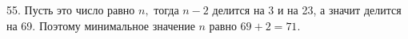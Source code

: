 55. Пусть это число равно $n,$ тогда $n-2$ делится на 3 и на 23, а значит делится на 69. Поэтому минимальное значение $n$ равно $69+2=71.$\\
